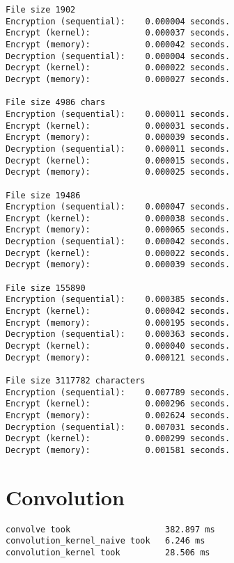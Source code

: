 \documentclass[a4paper]{article}
\begin{document}
\begin{verbatim}
File size 1902
Encryption (sequential): 	0.000004 seconds.
Encrypt (kernel): 			0.000037 seconds.
Encrypt (memory): 			0.000042 seconds.
Decryption (sequential): 	0.000004 seconds.
Decrypt (kernel): 			0.000022 seconds.
Decrypt (memory): 			0.000027 seconds.

File size 4986 chars
Encryption (sequential): 	0.000011 seconds.
Encrypt (kernel): 			0.000031 seconds.
Encrypt (memory): 			0.000039 seconds.
Decryption (sequential): 	0.000011 seconds.
Decrypt (kernel): 			0.000015 seconds.
Decrypt (memory): 			0.000025 seconds.

File size 19486
Encryption (sequential): 	0.000047 seconds.
Encrypt (kernel): 			0.000038 seconds.
Encrypt (memory): 			0.000065 seconds.
Decryption (sequential): 	0.000042 seconds.
Decrypt (kernel): 			0.000022 seconds.
Decrypt (memory): 			0.000039 seconds.

File size 155890
Encryption (sequential): 	0.000385 seconds.
Encrypt (kernel): 			0.000042 seconds.
Encrypt (memory): 			0.000195 seconds.
Decryption (sequential): 	0.000363 seconds.
Decrypt (kernel): 			0.000040 seconds.
Decrypt (memory): 			0.000121 seconds.

File size 3117782 characters
Encryption (sequential): 	0.007789 seconds.
Encrypt (kernel): 			0.000296 seconds.
Encrypt (memory): 			0.002624 seconds.
Decryption (sequential): 	0.007031 seconds.
Decrypt (kernel): 			0.000299 seconds.
Decrypt (memory): 			0.001581 seconds.
\end{verbatim}

\section{Convolution}

\begin{verbatim}
convolve took 					382.897 ms
convolution_kernel_naive took 	6.246 ms
convolution_kernel took 		28.506 ms
\end{verbatim}
\end{document}
